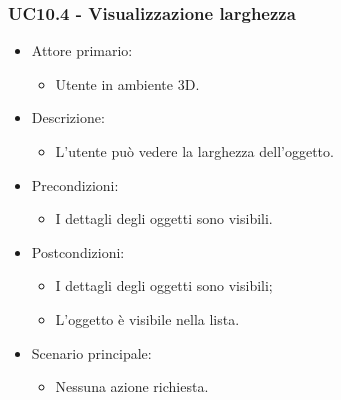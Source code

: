 \subsubsection{UC10.4 - Visualizzazione larghezza}
\begin{itemize}

	\item Attore primario: 
	\begin{itemize}
		\item Utente in ambiente 3D.
	\end{itemize}
	\item Descrizione:
	\begin{itemize}
		\item L'utente può vedere la larghezza dell'oggetto.
	\end{itemize}
	
	\item Precondizioni:
	\begin{itemize}
		\item I dettagli degli oggetti sono visibili.
	\end{itemize}
	
	\item Postcondizioni:
	\begin{itemize}
		\item  I dettagli degli oggetti sono visibili;
		\item L'oggetto è visibile nella lista.
	\end{itemize}
	
	\item Scenario principale:
	\begin{itemize}
		\item Nessuna azione richiesta.
	\end{itemize}
	
\end{itemize}

